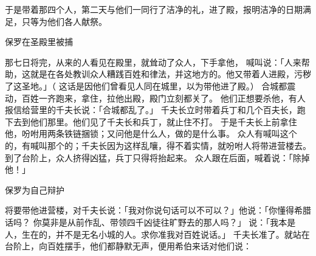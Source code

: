 {于是{}带着那四个人，第二天与他们一同行了洁净的礼，进了殿，报明洁净的日期满足，只等{}为他们各人献祭。
\par }{\SH 保罗在圣殿里被捕
\par }{\PP {}那七日将完，从{}来的{}人看见{}在殿里，就耸动了众人，下手拿他，
喊叫说：「{}人来帮助，这就是在各处教训众人糟践{}百姓和律法，并这地方的。他又带着{}人进殿，污秽了这圣地。」（
这话是因他们曾看见{}人{}同{}在城里，以为{}带他进了殿。）
合城都震动，百姓一齐跑来，拿住{}，拉他出殿，殿门立刻都关了。
他们正想要杀他，有人报信给营里的千夫长说：「{}合城都乱了。」
千夫长立时带着兵丁和几个百夫长，跑下去到他们那里。他们见了千夫长和兵丁，就止住不打{}。
于是千夫长上前拿住他，吩咐用两条铁链捆锁；又问他是什么人，做的是什么事。
众人有喊叫这个的，有喊叫那个的；千夫长因为这样乱嚷，得不着实情，就吩咐人将{}带进营楼去。
到了台阶上，众人挤得凶猛，兵丁只得将{}抬起来。
众人跟在后面，喊着说：「除掉他！」
\par }{\SH 保罗为自己辩护
\par }{\PP {}将要带他进营楼，{}对千夫长说：「我对你说句话可以不可以？」他说：「你懂得希腊话吗？
你莫非是从前作乱、带领四千凶徒往旷野去的那{}人吗？」
说：「我本是{}人，生在{}的{}，并不是无名小城的人。求你准我对百姓说话。」
千夫长准了。{}就站在台阶上，向百姓摆手，他们都静默无声，{}便用希伯来话对他们说：

}
